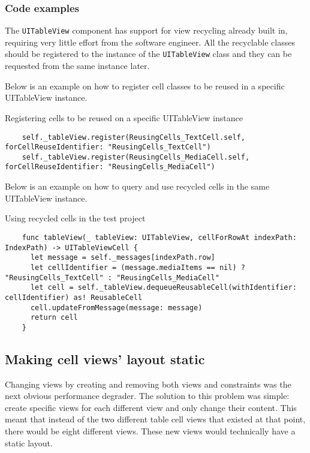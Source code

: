 \documentclass[a4paper,12pt]{article}
\begin{document}

\subsubsection*{Code examples}
The \texttt{UITableView} component has support for view recycling already built in, requiring very little effort from the software engineer. All the recyclable classes should be registered to the instance of the \texttt{UITableView} class and they can be requested from the same instance later.

Below is an example on how to register cell classes to be reused in a specific UITableView instance.
\begin{listing}[H]
  \caption{Registering cells to be reused on a specific UITableView instance}
  \begin{verbatim}
    self._tableView.register(ReusingCells_TextCell.self, forCellReuseIdentifier: "ReusingCells_TextCell")
    self._tableView.register(ReusingCells_MediaCell.self, forCellReuseIdentifier: "ReusingCells_MediaCell")
  \end{verbatim}
\end{listing}

Below is an example on how to query and use recycled cells in the same UITableView instance.
\begin{listing}[H]
  \caption{Using recycled cells in the test project}
  \begin{verbatim}
    func tableView(_ tableView: UITableView, cellForRowAt indexPath: IndexPath) -> UITableViewCell {
      let message = self._messages[indexPath.row]
      let cellIdentifier = (message.mediaItems == nil) ? "ReusingCells_TextCell" : "ReusingCells_MediaCell"
      let cell = self._tableView.dequeueReusableCell(withIdentifier: cellIdentifier) as! ReusableCell
      cell.updateFromMessage(message: message)
      return cell
    }
  \end{verbatim}
\end{listing}

\subsection{Making cell views' layout static}
Changing views by creating and removing both views and constraints was the next obvious performance degrader. The solution to this problem was simple: create specific views for each different view and only change their content. This meant that instead of the two different table cell views that existed at that point, there would be eight different views. These new views would technically have a static layout.
\end{document}
